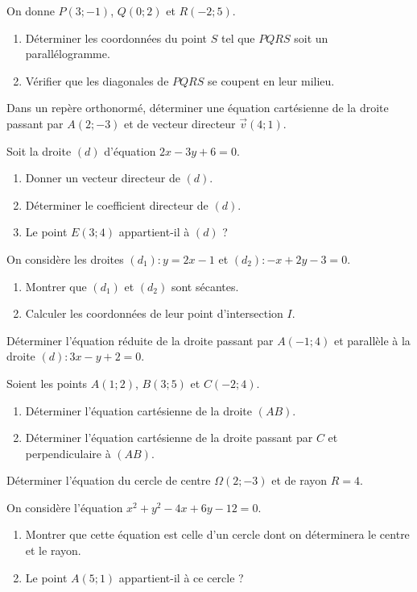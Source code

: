 \exo{}
On donne $P(3; -1)$, $Q(0; 2)$ et $R(-2; 5)$.
\begin{enumerate}[label=\alph*)]
    \item Déterminer les coordonnées du point $S$ tel que $PQRS$ soit un parallélogramme.
    \item Vérifier que les diagonales de $PQRS$ se coupent en leur milieu.
\end{enumerate}


\exo{}
Dans un repère orthonormé, déterminer une équation cartésienne de la droite passant par $A(2; -3)$ et de vecteur directeur $\vec{v}(4; 1)$.

\exo{}
Soit la droite $(d)$ d'équation $2x - 3y + 6 = 0$.
\begin{enumerate}[label=\alph*)]
    \item Donner un vecteur directeur de $(d)$.
    \item Déterminer le coefficient directeur de $(d)$.
    \item Le point $E(3; 4)$ appartient-il à $(d)$ ?
\end{enumerate}

\exo{}
On considère les droites $(d_1) : y = 2x - 1$ et $(d_2) : -x + 2y - 3 = 0$.
\begin{enumerate}[label=\alph*)]
    \item Montrer que $(d_1)$ et $(d_2)$ sont sécantes.
    \item Calculer les coordonnées de leur point d'intersection $I$.
\end{enumerate}

\exo{}
Déterminer l'équation réduite de la droite passant par $A(-1; 4)$ et parallèle à la droite $(d) : 3x - y + 2 = 0$.

\exo{}
Soient les points $A(1; 2)$, $B(3; 5)$ et $C(-2; 4)$.
\begin{enumerate}[label=\alph*)]
    \item Déterminer l'équation cartésienne de la droite $(AB)$.
    \item Déterminer l'équation cartésienne de la droite passant par $C$ et perpendiculaire à $(AB)$.
\end{enumerate}


\exo{}
Déterminer l'équation du cercle de centre $\Omega(2; -3)$ et de rayon $R = 4$.

\exo{}
On considère l'équation $x^2 + y^2 - 4x + 6y - 12 = 0$.
\begin{enumerate}[label=\alph*)]
    \item Montrer que cette équation est celle d'un cercle dont on déterminera le centre et le rayon.
    \item Le point $A(5; 1)$ appartient-il à ce cercle ?
\end{enumerate}

